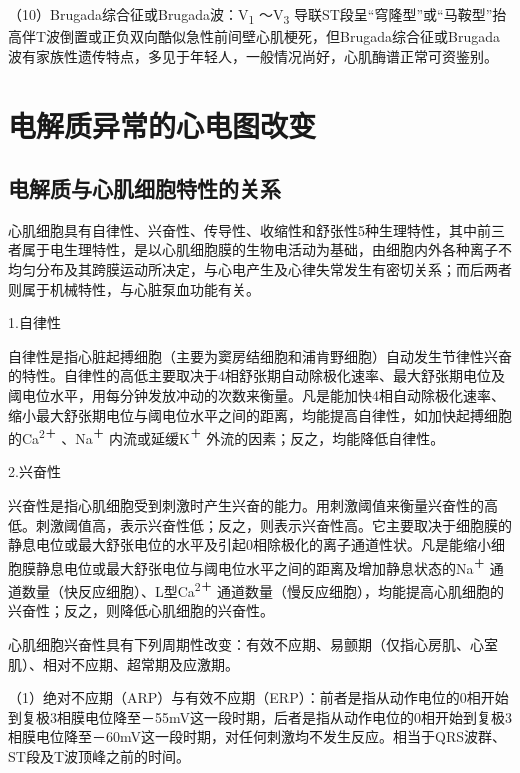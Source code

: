 （10）Brugada综合征或Brugada波：V\textsubscript{1} ～V\textsubscript{3}
导联ST段呈“穹隆型”或“马鞍型”抬高伴T波倒置或正负双向酷似急性前间壁心肌梗死，但Brugada综合征或Brugada波有家族性遗传特点，多见于年轻人，一般情况尚好，心肌酶谱正常可资鉴别。

\protect\hypertarget{text00053.html}{}{}

\protect\hypertarget{text00053.htmlux5cux23chapter53}{}{}

\chapter{电解质异常的心电图改变}

\protect\hypertarget{text00053.htmlux5cux23subid635}{}{}

\section{电解质与心肌细胞特性的关系}

心肌细胞具有自律性、兴奋性、传导性、收缩性和舒张性5种生理特性，其中前三者属于电生理特性，是以心肌细胞膜的生物电活动为基础，由细胞内外各种离子不均匀分布及其跨膜运动所决定，与心电产生及心律失常发生有密切关系；而后两者则属于机械特性，与心脏泵血功能有关。

1.自律性

自律性是指心脏起搏细胞（主要为窦房结细胞和浦肯野细胞）自动发生节律性兴奋的特性。自律性的高低主要取决于4相舒张期自动除极化速率、最大舒张期电位及阈电位水平，用每分钟发放冲动的次数来衡量。凡是能加快4相自动除极化速率、缩小最大舒张期电位与阈电位水平之间的距离，均能提高自律性，如加快起搏细胞的Ca\textsuperscript{2＋}
、Na\textsuperscript{＋} 内流或延缓K\textsuperscript{＋}
外流的因素；反之，均能降低自律性。

2.兴奋性

兴奋性是指心肌细胞受到刺激时产生兴奋的能力。用刺激阈值来衡量兴奋性的高低。刺激阈值高，表示兴奋性低；反之，则表示兴奋性高。它主要取决于细胞膜的静息电位或最大舒张电位的水平及引起0相除极化的离子通道性状。凡是能缩小细胞膜静息电位或最大舒张电位与阈电位水平之间的距离及增加静息状态的Na\textsuperscript{＋}
通道数量（快反应细胞）、L型Ca\textsuperscript{2＋}
通道数量（慢反应细胞），均能提高心肌细胞的兴奋性；反之，则降低心肌细胞的兴奋性。

心肌细胞兴奋性具有下列周期性改变：有效不应期、易颤期（仅指心房肌、心室肌）、相对不应期、超常期及应激期。

（1）绝对不应期（ARP）与有效不应期（ERP）：前者是指从动作电位的0相开始到复极3相膜电位降至－55mV这一段时期，后者是指从动作电位的0相开始到复极3相膜电位降至－60mV这一段时期，对任何刺激均不发生反应。相当于QRS波群、ST段及T波顶峰之前的时间。

